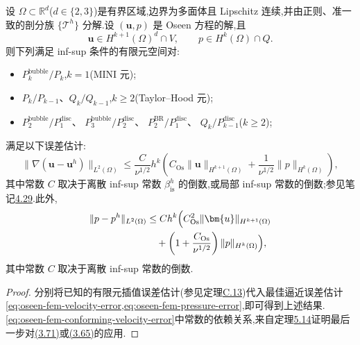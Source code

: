 \begin{corollary}[协调有限元空间对的误差估计]\label{cor:oseen-fem-conforming-error-estimates}
设 $\Omega\subset\mathbb{R}^d$($d\in\{2,3\}$)是有界区域,边界为多面体且 Lipschitz 连续,并由正则、准一致的剖分族 $\{\mathcal{T}^h\}$ 分解.设 $(\bm{u},p)$ 是 Oseen 方程的解,且
\[
  \bm{u}\in H^{k+1}(\Omega)^d\cap V,\qquad
  p\in H^k(\Omega)\cap Q.
\]
则下列满足 inf-sup 条件的有限元空间对:
\begin{itemize}
  \item $P_k^{\mathrm{bubble}}/P_k$,$k=1$(MINI 元);
  \item $P_k/P_{k-1}$、$Q_k/Q_{k-1}$,$k\ge2$(Taylor--Hood 元);
  \item $P_2^{\mathrm{bubble}}/P_1^{\mathrm{disc}}$、
        $P_3^{\mathrm{bubble}}/P_2^{\mathrm{disc}}$、
        $P_2^{\mathrm{BR}}/P_1^{\mathrm{disc}}$、
        $Q_k/P_{k-1}^{\mathrm{disc}}$($k\ge2$);
\end{itemize}
满足以下误差估计:
\begin{equation}\label{eq:oseen-fem-conforming-velocity-error}
  \|\nabla(\bm{u}-\bm{u}^h)\|_{L^2(\Omega)}
  \le\frac{C}{\nu^{1/2}}h^k
     \left(C_{\mathrm{Os}}\|\bm{u}\|_{H^{k+1}(\Omega)}
       +\frac{1}{\nu^{1/2}}\|p\|_{H^k(\Omega)}\right),
\end{equation}
其中常数 $C$ 取决于离散 inf-sup 常数 $\beta_{\mathrm{is}}^h$ 的倒数,或局部 inf-sup 常数的倒数;参见笔记\hyperref[note:stokes-error-infsup-dependency]{4.29}.此外,
\begin{equation}\label{eq:oseen-fem-conforming-pressure-error}
  \begin{aligned}
    \|p-p^h\|_{L^2(\Omega)}
      &\le Ch^k\Bigl(
          C_{\mathrm{Os}}^2\|\bm{u}\|_{H^{k+1}(\Omega)}\\
      &\quad+\left(1+\frac{C_{\mathrm{Os}}}{\nu^{1/2}}\right)
          \|p\|_{H^k(\Omega)}\Bigr),
  \end{aligned}
\end{equation}
其中常数 $C$ 取决于离散 inf-sup 常数的倒数.
\end{corollary}
\begin{proof}
分别将已知的有限元插值误差估计(参见定理\hyperref[thm:appendix-c-13]{C.13})代入最佳逼近误差估计\cref{eq:oseen-fem-velocity-error,eq:oseen-fem-pressure-error},即可得到上述结果.\cref{eq:oseen-fem-conforming-velocity-error}中常数的依赖关系,来自定理\hyperref[thm:oseen-fem-velocity-error]{5.14}证明最后一步对\hyperref[eq:best-approximation-preserving-interpolant]{(3.71)}或\hyperref[eq:best-approximation-vdiv-bound]{(3.65)}的应用.
\end{proof}


